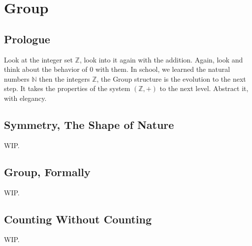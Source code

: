 \section{Group \label{group}}
\subsection{Prologue}
Look at the integer set $\mathbb{Z}$, look into it again with the addition. Again, look and think about the behavior of $0$ with them. In school, we learned the natural numbers $\mathbb{N}$ then the integers $\mathbb{Z}$, the Group structure is the evolution to the next step. It takes the properties of the system $(\mathbb{Z},+)$ to the next level. Abstract it, with elegancy.

\subsection{Symmetry, The Shape of Nature}
WIP.

\subsection{Group, Formally}
WIP.


\subsection{Counting Without Counting}
WIP.
